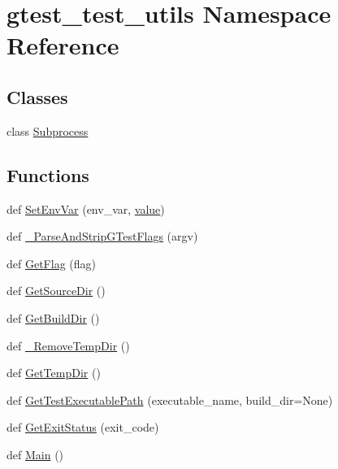\hypertarget{namespacegtest__test__utils}{}\section{gtest\+\_\+test\+\_\+utils Namespace Reference}
\label{namespacegtest__test__utils}
\subsection*{Classes}
\begin{DoxyCompactItemize}
\item 
class \mbox{\hyperlink{classgtest__test__utils_1_1_subprocess}{Subprocess}}
\end{DoxyCompactItemize}
\subsection*{Functions}
\begin{DoxyCompactItemize}
\item 
def \mbox{\hyperlink{namespacegtest__test__utils_a616ee0f04e98e54b128cbe492def9bb1}{Set\+Env\+Var}} (env\+\_\+var, \mbox{\hyperlink{_obj__test_2lib_2googletest-master_2googlemock_2test_2gmock-matchers__test_8cc_a337b8a670efc0b086ad3af163f3121b6}{value}})
\item 
def \mbox{\hyperlink{namespacegtest__test__utils_a05ad62af6574fd7e4fa2cc7c952c4f0b}{\+\_\+\+Parse\+And\+Strip\+G\+Test\+Flags}} (argv)
\item 
def \mbox{\hyperlink{namespacegtest__test__utils_a052da74a5e39162480daf3a4d8eff9a6}{Get\+Flag}} (flag)
\item 
def \mbox{\hyperlink{namespacegtest__test__utils_aaff66cb0980804d8bd57dc719d4b5518}{Get\+Source\+Dir}} ()
\item 
def \mbox{\hyperlink{namespacegtest__test__utils_a1eacd9a471dfa6133028923ea755d22c}{Get\+Build\+Dir}} ()
\item 
def \mbox{\hyperlink{namespacegtest__test__utils_a2fcd62f625111800ee67e0afe46b2c75}{\+\_\+\+Remove\+Temp\+Dir}} ()
\item 
def \mbox{\hyperlink{namespacegtest__test__utils_a25987e1cd76e93068b2afe6bac909d12}{Get\+Temp\+Dir}} ()
\item 
def \mbox{\hyperlink{namespacegtest__test__utils_a89ed3717984a80ffbb7a9c92f71b86a2}{Get\+Test\+Executable\+Path}} (executable\+\_\+name, build\+\_\+dir=None)
\item 
def \mbox{\hyperlink{namespacegtest__test__utils_acf8280de4dc027a28ffc9de43f245b50}{Get\+Exit\+Status}} (exit\+\_\+code)
\item 
def \mbox{\hyperlink{namespacegtest__test__utils_a5361b42d9c6843b5b117ead4d1c58cc5}{Main}} ()
\end{DoxyCompactItemize}
